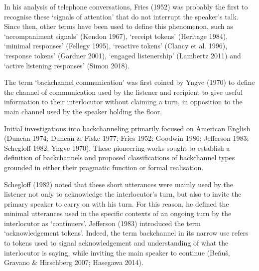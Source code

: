 \begin{styleStandard}
In his analysis of telephone conversations, Fries (1952) was probably the first to recognise these ‘signals of attention’ that do not interrupt the speaker’s talk. Since then, other terms have been used to define this phenomenon, such as ‘accompaniment signals’ (Kendon 1967), ‘receipt tokens’ (Heritage 1984), ‘minimal responses’ (Fellegy 1995), ‘reactive tokens’ (Clancy et al. 1996), ‘response tokens’ (Gardner 2001), ‘engaged listenership’ (Lambertz 2011) and ‘active listening responses’ (Simon 2018).
\end{styleStandard}

\begin{styleStandard}
The term ‘backchannel communication’ was first coined by Yngve (1970) to define the channel of communication used by the listener and recipient to give useful information to their interlocutor without claiming a turn, in opposition to the main channel used by the speaker holding the floor.
\end{styleStandard}

\begin{styleStandard}
Initial investigations into backchanneling primarily focused on American English (Duncan 1974; Duncan \& Fiske 1977; Fries 1952; Goodwin 1986; Jefferson 1983; Schegloff 1982; Yngve 1970). These pioneering works sought to establish a definition of backchannels and proposed classifications of backchannel types grounded in either their pragmatic function or formal realisation.
\end{styleStandard}

\begin{styleStandard}
Schegloff (1982) noted that these short utterances were mainly used by the listener not only to acknowledge the interlocutor’s turn, but also to invite the primary speaker to carry on with his turn. For this reason, he defined the minimal utterances used in the specific contexts of an ongoing turn by the interlocutor as ‘continuers’. Jefferson (1983) introduced the term ‘acknowledgement tokens’. Indeed, the term backchannel in its narrow use refers to tokens used to signal acknowledgement and understanding of what the interlocutor is saying, while inviting the main speaker to continue (Beňuš, Gravano \& Hirschberg 2007; Hasegawa 2014).
\end{styleStandard}

